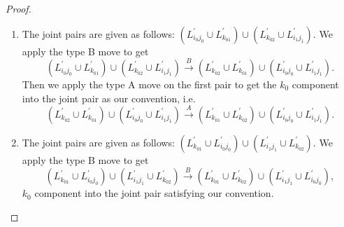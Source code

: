 \documentclass{amsart}
\theoremstyle{plain}
\theoremstyle{remark}
\theoremstyle{definition}
\begin{document}
\begin{proof}
\begin{enumerate}
\begin{enumerate}
        
        \item [Case 2.] The joint pairs are given as follows: $(L^{\prime}_{i_0j_0} \cup L^{\prime}_{k_01}) \cup (L^{\prime}_{k_02}\cup L^{\prime}_{i_1j_1})$.
        We apply the type B move to get 
        $$(L^{\prime}_{i_0j_0} \cup L^{\prime}_{k_01}) \cup (L^{\prime}_{k_02}\cup L^{\prime}_{i_1j_1})\xrightarrow[]{B}( L^{\prime}_{k_02}\cup L^{\prime}_{k_01}) \cup (L^{\prime}_{i_0j_0}\cup L^{\prime}_{i_1j_1}).$$ 
        Then we apply the type A move on the first pair to get the $k_0$ component into the joint pair as our convention, i.e.
        $$( L^{\prime}_{k_02}\cup L^{\prime}_{k_01}) \cup (L^{\prime}_{i_0j_0}\cup L^{\prime}_{i_1j_1})\xrightarrow[]{A}(L^{\prime}_{k_01}\cup L^{\prime}_{k_02}) \cup (L^{\prime}_{i_0j_0}\cup L^{\prime}_{i_1j_1}).$$
        
        \item [Case 3.] The joint pairs are given as follows: $(L^{\prime}_{k_01} \cup L^{\prime}_{i_0j_0}) \cup ( L^{\prime}_{i_1j_1}\cup L^{\prime}_{k_02})$. 
        We apply the type B move to get 
        $$(L^{\prime}_{k_01} \cup L^{\prime}_{i_0j_0}) \cup ( L^{\prime}_{i_1j_1}\cup L^{\prime}_{k_02})\xrightarrow[]{B}(L^{\prime}_{k_01} \cup L^{\prime}_{k_02}) \cup ( L^{\prime}_{i_1j_1}\cup L^{\prime}_{i_0j_0}),$$ 
        $k_0$ component into the joint pair satisfying our convention.
        

\end{enumerate}
\end{enumerate}
\end{proof}
\end{document}

